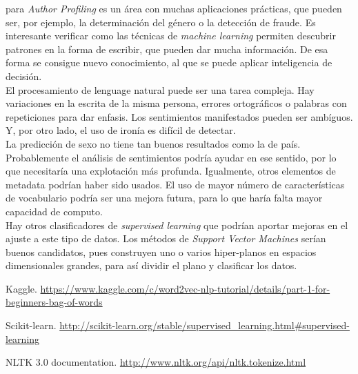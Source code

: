 \documentclass[11pt,a4paper]{article}
\begin{document}
   para {\em Author Profiling} es un \'area con muchas aplicaciones pr\'acticas, que pueden ser, por ejemplo, la determinaci\'on del g\'enero o la detecci\'on de fraude. Es interesante verificar como las t\'ecnicas de {\em machine learning} permiten descubrir patrones en la forma de escribir, que pueden dar mucha informaci\'on. De esa forma se consigue nuevo conocimiento, al que se puede aplicar inteligencia de decisi\'on.\\
  \indent El procesamiento de lenguage natural puede ser una tarea compleja. Hay variaciones en la escrita de la misma persona, errores ortogr\'aficos o palabras con repeticiones para dar enfasis. Los sentimientos manifestados pueden ser amb\'iguos. Y, por otro lado, el uso de iron\'ia es dif\'icil de detectar.\\
  \indent La predicci\'on de sexo no tiene tan buenos resultados como la de pa\'is. Probablemente el an\'alisis de sentimientos podr\'ia ayudar en ese sentido, por lo que necesitar\'ia una explotaci\'on m\'as profunda. Igualmente, otros elementos de metadata podr\'ian haber sido usados.
  \indent El uso de mayor n\'umero de caracter\'isticas de vocabulario podr\'ia ser una mejora futura, para lo que har\'ia falta mayor capacidad de computo.\\
  \indent Hay otros clasificadores de {\em supervised learning} que podr\'ian aportar mejoras en el ajuste a este tipo de datos. Los m\'etodos de {\em Support Vector Machines} ser\'ian buenos candidatos, pues construyen uno o varios hiper-planos en espacios dimensionales grandes, para as\'i dividir el plano y clasificar los datos. 

\begin{thebibliography}{}

\bibitem{} Kaggle.
\newblock \url{https://www.kaggle.com/c/word2vec-nlp-tutorial/details/part-1-for-beginners-bag-of-words}

\bibitem{} Scikit-learn.
\newblock \url{http://scikit-learn.org/stable/supervised_learning.html#supervised-learning}

\bibitem{} NLTK 3.0 documentation.
\newblock \url{http://www.nltk.org/api/nltk.tokenize.html}


\end{thebibliography}
\end{document}
